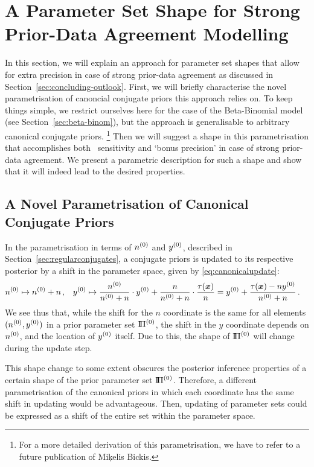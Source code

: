 \section{A Parameter Set Shape for Strong Prior-Data Agreement Modelling}
\label{sec:boatshape}

In this section, we will explain an approach for parameter set shapes
that allow for extra precision in case of strong prior-data agreement
as discussed in Section~\ref{sec:concluding-outlook}.
First, we will briefly characterise the novel parametrisation of canoncial conjugate priors this approach relies on.
To keep things simple, we restrict ourselves here for the case of the Beta-Binomial model
(see Section~\ref{sec:beta-binom}),
but the approach is generalisable to arbitrary canonical conjugate priors.%
\footnote{For a more detailed derivation of this parametrisation,
we have to refer to a future publication of Mi\c{k}elis Bickis.}
Then we will suggest a shape in this parametrisation that accomplishes
both \pdc\ sensitivity and `bonus precision' in case of strong prior-data agreement.
We present a parametric description for such a shape
and show that it will indeed lead to the desired properties.

\subsection{A Novel Parametrisation of Canonical Conjugate Priors}
\label{sec:miksworld}

In the parametrisation in terms of $n^{(0)}$ and $y^{(0)}$, described in Section~\ref{sec:regularconjugates},
a conjugate priors is updated to its respective posterior by a shift in the parameter space,
given by \eqref{eq:canonicalupdate}:
\begin{align*}
n^{(0)} &\mapsto n^{(0)} + n\,, &
y^{(0)} &\mapsto \frac{n^{(0)}}{n^{(0)} + n} \cdot y^{(0)} + \frac{n}{n^{(0)} + n} \cdot \frac{\tau({\bm x})}{n} = y^{(0)} + \frac{\tau({\bm x})-ny^{(0)}}{n^{(0)}+n}\,.
\end{align*}
We see thus that, while the shift for the $n$ coordinate is the same for all elements $(n^{(0)},y^{(0)})$
in a prior parameter set $\text{I}\!\Pi^{(0)}$,
the shift in the $y$ coordinate depends on $n^{(0)}$, and the location of $y^{(0)}$ itself.
Due to this, the shape of $\text{I}\!\Pi^{(0)}$ will change during the update step.

This shape change to some extent obscures the posterior inference properties
of a certain shape of the prior parameter set $\text{I}\!\Pi^{(0)}$.
Therefore, a different parametrisation of the canonical priors
in which each coordinate has the same shift in updating would be advantageous.
Then, updating of parameter sets
could be expressed as a shift of the entire set within the parameter space.

